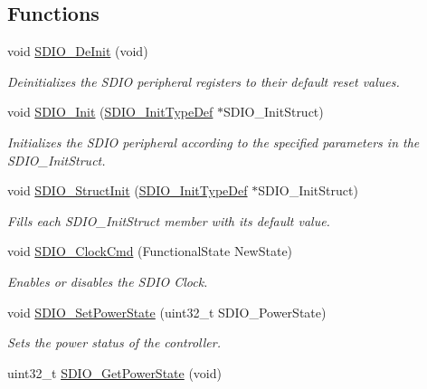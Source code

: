 \subsection*{Functions}
\begin{DoxyCompactItemize}
\item 
void \hyperlink{group___s_d_i_o_gac359d2c6c67a2590f8f9b720c0e4ff1b}{S\-D\-I\-O\-\_\-\-De\-Init} (void)
\begin{DoxyCompactList}\small\item\em Deinitializes the S\-D\-I\-O peripheral registers to their default reset values. \end{DoxyCompactList}\item 
void \hyperlink{group___s_d_i_o_gad40764a8e37c0ed5c9141ae338ff0203}{S\-D\-I\-O\-\_\-\-Init} (\hyperlink{struct_s_d_i_o___init_type_def}{S\-D\-I\-O\-\_\-\-Init\-Type\-Def} $\ast$S\-D\-I\-O\-\_\-\-Init\-Struct)
\begin{DoxyCompactList}\small\item\em Initializes the S\-D\-I\-O peripheral according to the specified parameters in the S\-D\-I\-O\-\_\-\-Init\-Struct. \end{DoxyCompactList}\item 
void \hyperlink{group___s_d_i_o_ga778d338c29df4fae9ef69432e6df32ad}{S\-D\-I\-O\-\_\-\-Struct\-Init} (\hyperlink{struct_s_d_i_o___init_type_def}{S\-D\-I\-O\-\_\-\-Init\-Type\-Def} $\ast$S\-D\-I\-O\-\_\-\-Init\-Struct)
\begin{DoxyCompactList}\small\item\em Fills each S\-D\-I\-O\-\_\-\-Init\-Struct member with its default value. \end{DoxyCompactList}\item 
void \hyperlink{group___s_d_i_o_ga7243b857d6b323748ff3a493b265bedc}{S\-D\-I\-O\-\_\-\-Clock\-Cmd} (Functional\-State New\-State)
\begin{DoxyCompactList}\small\item\em Enables or disables the S\-D\-I\-O Clock. \end{DoxyCompactList}\item 
void \hyperlink{group___s_d_i_o_ga36ecca32b904de74218fbe65cd5f5270}{S\-D\-I\-O\-\_\-\-Set\-Power\-State} (uint32\-\_\-t S\-D\-I\-O\-\_\-\-Power\-State)
\begin{DoxyCompactList}\small\item\em Sets the power status of the controller. \end{DoxyCompactList}\item 
uint32\-\_\-t \hyperlink{group___s_d_i_o_ga3a19de2c7cd51645702213f64a1758ed}{S\-D\-I\-O\-\_\-\-Get\-Power\-State} (void)

\end{DoxyCompactItemize}
